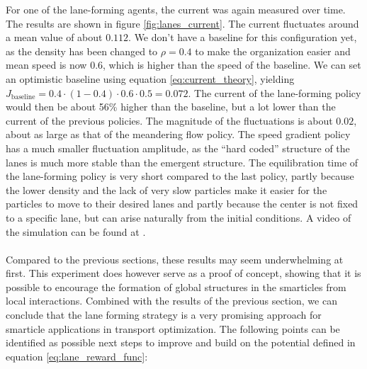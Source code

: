 For one of the lane-forming agents, the current was again measured over time. The results are shown in figure \ref{fig:lanes_current}. The current fluctuates around a mean value of about $0.112$. We don't have a baseline for this configuration yet, as the density has been changed to $\rho=0.4$ to make the organization easier and mean speed is now $0.6$, which is higher than the speed of the baseline. We can set an optimistic baseline using equation \ref{eq:current_theory}, yielding $J_{\text{baseline}}=0.4\cdot(1-0.4)\cdot0.6\cdot0.5=0.072$. The current of the lane-forming policy would then be about 56\% higher than the baseline, but a lot lower than the current of the previous policies. The magnitude of the fluctuations is about $0.02$, about as large as that of the meandering flow policy. The speed gradient policy has a much smaller fluctuation amplitude, as the \enquote{hard coded} structure of the lanes is much more stable than the emergent structure. The equilibration time of the lane-forming policy is very short compared to the last policy, partly because the lower density and the lack of very slow particles make it easier for the particles to move to their desired lanes and partly because the center is not fixed to a specific lane, but can arise naturally from the initial conditions. A video of the simulation can be found at \cite{maertens_smarticle_lane_vid_local}.
\\
\\
Compared to the previous sections, these results may seem underwhelming at first. This experiment does however serve as a proof of concept, showing that it is possible to encourage the formation of global structures in the smarticles from local interactions. Combined with the results of the previous section, we can conclude that the lane forming strategy is a very promising approach for smarticle applications in transport optimization. The following points can be identified as possible next steps to improve and build on the potential defined in equation \ref{eq:lane_reward_func}:
